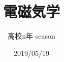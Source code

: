 \documentclass{jsarticle}
\begin{document}
\title{電磁気学}
\author{高校n年 season}
\date{2019/05/19}
\maketitle
\tableofcontents
\newcommand{\repart}[1]{\part{#1}\setcounter{section}{0}}
\newcommand{\lr}[1]{\left(#1 \right)}
\newcommand{\mlr}[1]{\left\{#1 \right\}}
\newcommand{\llr}[1]{\left[#1 \right]}
\newcommand{\na}[1]{\mathrm{#1}}
\newcommand{\rec}[1]{\frac{1}{#1}}
\newcommand{\de}[2][]{\frac{d #1}{d #2}}
\newcommand{\di}[2][]{\frac{d #1}{d #2}}
\newcommand{\dd}[2][]{\frac{d^2 #1}{d #2^2}}
\newcommand{\pd}[2][]{\frac{\partial #1}{\partial #2}}
\newcommand{\grad}{\mathrm{grad}}
\newcommand{\dive}{\mathrm{div}}
\newcommand{\rot}{\mathrm{rot}}

\end{document}
